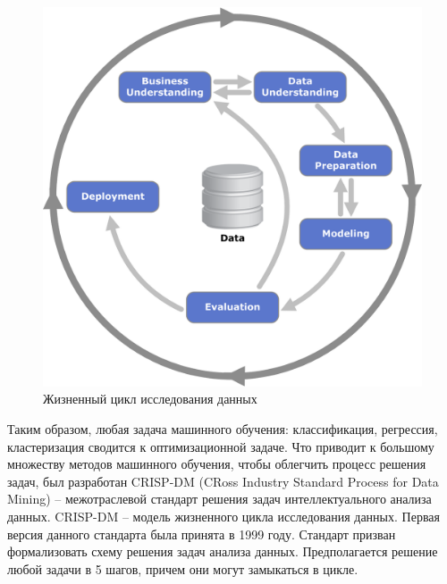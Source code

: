 \begin{figure} 
    \vspace{-5ex}
    \includegraphics[width=\linewidth]{src/img/CRISP-DM_process_diagram.png}
    \caption{Жизненный цикл исследования данных \cite{wiki:crisp_dm}}
    \label{fig:crisp_dm}
\end{figure}

Таким образом, любая задача машинного обучения: классификация, регрессия, кластеризация сводится к оптимизационной задаче. Что приводит к большому множеству методов машинного обучения, чтобы облегчить процесс решения задач, был разработан CRISP-DM (CRoss Industry Standard Process for Data Mining) -- межотраслевой стандарт решения задач интеллектуального анализа данных. CRISP-DM -- модель жизненного цикла исследования данных.
Первая версия данного стандарта была принята в 1999 году. Стандарт призван формализовать схему решения задач анализа данных. Предполагается решение любой задачи в 5 шагов, причем они могут замыкаться в цикле. 

